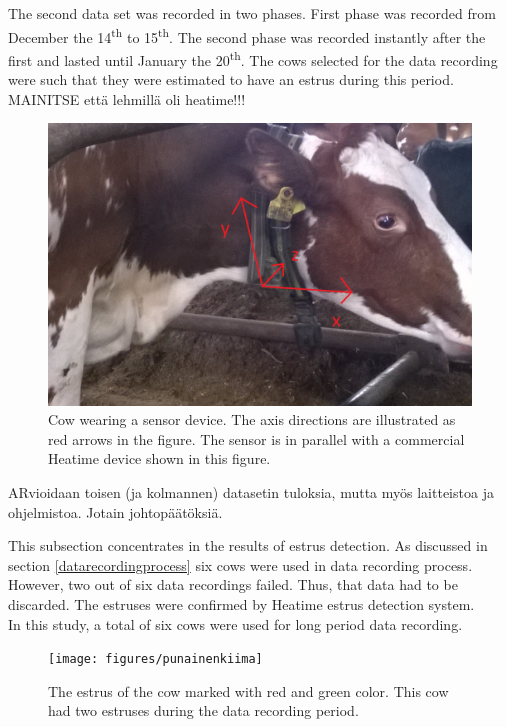 \documentclass[english,12pt,a4paper,pdftex,elec,utf8]{aaltothesis}
\begin{document}
The second data set was recorded in two phases. First phase was recorded from December the 14\textsuperscript{th} to 15\textsuperscript{th}. The second phase was recorded instantly after the first and lasted until January the 20\textsuperscript{th}. The cows selected for the data recording were such that they were estimated to have an estrus during this period. \\

MAINITSE että lehmillä oli heatime!!!

\begin{figure}[thb]
\centering
\includegraphics[width = 0.75 \textwidth]{figures/sensorikaulassa1.png}
\caption{Cow wearing a sensor device. The axis directions are illustrated as red arrows in the figure. The sensor is in parallel with a commercial Heatime device shown in this figure.}\label{sensorikaulassakuva}
\end{figure}

ARvioidaan toisen (ja kolmannen) datasetin tuloksia, mutta myös laitteistoa ja ohjelmistoa. Jotain johtopäätöksiä.



This subsection concentrates in the results of estrus detection. As discussed in section \ref{datarecordingprocess} six cows were used in data recording process. However, two out of six data recordings failed. Thus, that data had to be discarded. The estruses were confirmed by Heatime estrus detection system. \\


In this study, a total of six cows were used for long period data recording.

\begin{figure}[htb]
\centering
\texttt{[image: figures/punainenkiima]}
\caption{The estrus of the cow marked with red and green color. This cow had two estruses during the data recording period.}
\label{punainenkiimaheattime}
\end{figure}
\end{document}
